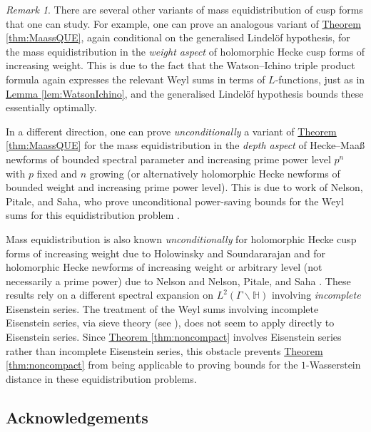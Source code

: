 \documentclass[11pt,a4paper]{amsart}
\newcommand{\Hb}{\mathbb{H}}
\numberwithin{equation}{section}
\theoremstyle{remark}
\newtheorem{remark}[equation]{Remark}
\theoremstyle{definition}
\begin{document}
\begin{remark}
There are several other variants of mass equidistribution of cusp forms that one can study. For example, one can prove an analogous variant of \hyperref[thm:MaassQUE]{Theorem \ref{thm:MaassQUE}}, again conditional on the generalised Lindel\"{o}f hypothesis, for the mass equidistribution in the \emph{weight aspect} of holomorphic Hecke cusp forms of increasing weight. This is due to the fact that the Watson--Ichino triple product formula again expresses the relevant Weyl sums in terms of $L$-functions, just as in \hyperref[lem:WatsonIchino]{Lemma \ref*{lem:WatsonIchino}}, and the generalised Lindel\"{o}f hypothesis bounds these essentially optimally.

In a different direction, one can prove \emph{unconditionally} a variant of \hyperref[thm:MaassQUE]{Theorem \ref{thm:MaassQUE}} for the mass equidistribution in the \emph{depth aspect} of Hecke--Maa\ss{} newforms of bounded spectral parameter and increasing prime power level $p^n$ with $p$ fixed and $n$ growing (or alternatively holomorphic Hecke newforms of bounded weight and increasing prime power level). This is due to work of Nelson, Pitale, and Saha, who prove unconditional power-saving bounds for the Weyl sums for this equidistribution problem \cite[Proposition 3.4]{NPS14}.

Mass equidistribution is also known \emph{unconditionally} for holomorphic Hecke cusp forms of increasing weight due to Holowinsky and Soundararajan \cite{Hol10,HS10,Sou10a} and for holomorphic Hecke newforms of increasing weight or arbitrary level (not necessarily a prime power) due to Nelson \cite{Nel11} and Nelson, Pitale, and Saha \cite{NPS14}. These results rely on a different spectral expansion on $L^2(\Gamma \backslash \Hb)$ involving \emph{incomplete} Eisenstein series. The treatment of the Weyl sums involving incomplete Eisenstein series, via sieve theory (see \cite{Hol10}), does not seem to apply directly to Eisenstein series. Since \hyperref[thm:noncompact]{Theorem \ref*{thm:noncompact}} involves Eisenstein series rather than incomplete Eisenstein series, this obstacle prevents \hyperref[thm:noncompact]{Theorem \ref*{thm:noncompact}} from being applicable to proving bounds for the $1$-Wasserstein distance in these equidistribution problems.
\end{remark}


{}
\hypersetup{bookmarksdepth=-1}

\subsection*{Acknowledgements}
\end{document}
